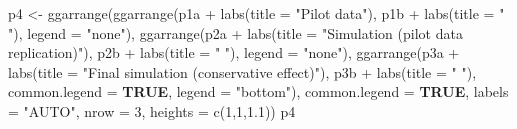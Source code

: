 \documentclass[
  bookmarksnumbered]{article}
\newenvironment{Shaded}{\begin{snugshade}}{\end{snugshade}}
\newcommand{\AttributeTok}[1]{\textcolor[rgb]{0.80,0.80,0.80}{#1}}
\newcommand{\ConstantTok}[1]{\textcolor[rgb]{0.86,0.64,0.64}{\textbf{#1}}}
\newcommand{\DecValTok}[1]{\textcolor[rgb]{0.86,0.86,0.80}{#1}}
\newcommand{\FloatTok}[1]{\textcolor[rgb]{0.75,0.75,0.82}{#1}}
\newcommand{\FunctionTok}[1]{\textcolor[rgb]{0.94,0.94,0.56}{#1}}
\newcommand{\NormalTok}[1]{\textcolor[rgb]{0.80,0.80,0.80}{#1}}
\newcommand{\OtherTok}[1]{\textcolor[rgb]{0.94,0.94,0.56}{#1}}
\newcommand{\SpecialCharTok}[1]{\textcolor[rgb]{0.86,0.64,0.64}{#1}}
\newcommand{\StringTok}[1]{\textcolor[rgb]{0.80,0.58,0.58}{#1}}
\begin{document}
\begin{Shaded}
\begin{Highlighting}[]
\NormalTok{p4 }\OtherTok{\textless{}{-}} \FunctionTok{ggarrange}\NormalTok{(}\FunctionTok{ggarrange}\NormalTok{(p1a }\SpecialCharTok{+} \FunctionTok{labs}\NormalTok{(}\AttributeTok{title =} \StringTok{"Pilot data"}\NormalTok{), }
\NormalTok{                          p1b }\SpecialCharTok{+} \FunctionTok{labs}\NormalTok{(}\AttributeTok{title =} \StringTok{" "}\NormalTok{),}
                          \AttributeTok{legend =} \StringTok{"none"}\NormalTok{), }
                \FunctionTok{ggarrange}\NormalTok{(p2a }\SpecialCharTok{+} \FunctionTok{labs}\NormalTok{(}\AttributeTok{title =} \StringTok{"Simulation (pilot data replication)"}\NormalTok{), }
\NormalTok{                          p2b }\SpecialCharTok{+} \FunctionTok{labs}\NormalTok{(}\AttributeTok{title =} \StringTok{" "}\NormalTok{),}
                          \AttributeTok{legend =} \StringTok{"none"}\NormalTok{),}
                \FunctionTok{ggarrange}\NormalTok{(p3a }\SpecialCharTok{+} \FunctionTok{labs}\NormalTok{(}\AttributeTok{title =} \StringTok{"Final simulation (conservative effect)"}\NormalTok{), }
\NormalTok{                          p3b }\SpecialCharTok{+} \FunctionTok{labs}\NormalTok{(}\AttributeTok{title =} \StringTok{" "}\NormalTok{),}
                          \AttributeTok{common.legend =} \ConstantTok{TRUE}\NormalTok{, }\AttributeTok{legend =} \StringTok{"bottom"}\NormalTok{),}
                \AttributeTok{common.legend =} \ConstantTok{TRUE}\NormalTok{,}
                \AttributeTok{labels =} \StringTok{"AUTO"}\NormalTok{,}
                \AttributeTok{nrow =} \DecValTok{3}\NormalTok{,}
                \AttributeTok{heights =} \FunctionTok{c}\NormalTok{(}\DecValTok{1}\NormalTok{,}\DecValTok{1}\NormalTok{,}\FloatTok{1.1}\NormalTok{))}
\NormalTok{p4}
\end{Highlighting}
\end{Shaded}
\end{document}
